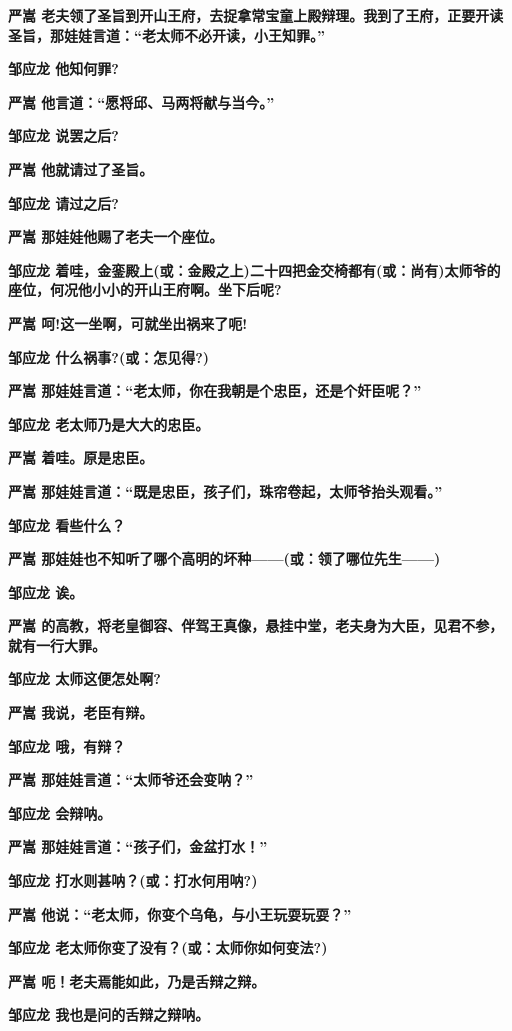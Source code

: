 \textbf{严嵩
老夫领了圣旨到开山王府，去捉拿常宝童上殿辩理。我到了王府，正要开读圣旨，那娃娃言道：``老太师不必开读，小王知罪。''}

\textbf{邹应龙 他知何罪?}

\textbf{严嵩 他言道：``愿将邱、马两将献与当今。''}

\textbf{邹应龙 说罢之后?}

\textbf{严嵩 他就请过了圣旨。}

\textbf{邹应龙 请过之后?}

\textbf{严嵩 那娃娃他赐了老夫一个座位。}

\textbf{邹应龙
着哇，金銮殿上(或：金殿之上)二十四把金交椅都有(或：尚有)太师爷的座位，何况他小小的开山王府啊。坐下后呢?}

\textbf{严嵩 呵!这一坐啊，可就坐出祸来了呃!}

\textbf{邹应龙 什么祸事?(或：怎见得?)}

\textbf{严嵩 那娃娃言道：``老太师，你在我朝是个忠臣，还是个奸臣呢？''}

\textbf{邹应龙 老太师乃是大大的忠臣。}

\textbf{严嵩 着哇。原是忠臣。}

\textbf{严嵩
那娃娃言道：``既是忠臣，孩子们，珠帘卷起，太师爷抬头观看。''}

\textbf{邹应龙 看些什么？}

\textbf{严嵩
那娃娃也不知听了哪个高明的坏种------(或：领了哪位先生------)}

\textbf{邹应龙 诶。}

\textbf{严嵩
的高教，将老皇御容、伴驾王真像，悬挂中堂，老夫身为大臣，见君不参，就有一行大罪。}

\textbf{邹应龙 太师这便怎处啊?}

\textbf{严嵩 我说，老臣有辩。}

\textbf{邹应龙 哦，有辩？}

\textbf{严嵩 那娃娃言道：``太师爷还会变呐？''}

\textbf{邹应龙 会辩呐。}

\textbf{严嵩 那娃娃言道：``孩子们，金盆打水！''}

\textbf{邹应龙 打水则甚呐？(或：打水何用呐?)}

\textbf{严嵩 他说：``老太师，你变个乌龟，与小王玩耍玩耍？''}

\textbf{邹应龙 老太师你变了没有？(或：太师你如何变法?)}

\textbf{严嵩 呃！老夫焉能如此，乃是舌辩之辩。}

\textbf{邹应龙 我也是问的舌辩之辩呐。}

